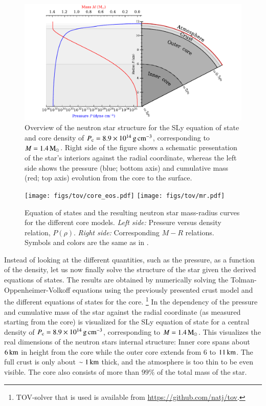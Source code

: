 \begin{figure}[t]
\centering
\includegraphics[width=16cm]{figs/slice/slice.pdf}
\caption{\label{fig:slice}
Overview of the neutron star structure for the SLy equation of state and core density of $P_{\mathrm{c}} = 8.9 \times 10^{14}\, \mathrm{g}\,\mathrm{cm}^{-3}$, corresponding to $M=1.4\, \mathrm{M}_{\odot}$.
Right side of the figure shows a schematic presentation of the star's interiors against the radial coordinate, whereas the left side shows the pressure (blue; bottom axis) and cumulative mass (red; top axis) evolution from the core to the surface.
}
\end{figure}

\begin{figure}[t]
\centering
\texttt{[image: figs/tov/core\_eos.pdf]}
\texttt{[image: figs/tov/mr.pdf]}
\caption{\label{fig:coreMR}
Equation of states and the resulting neutron star mass-radius curves for the different core models.
\emph{Left side:} Pressure versus density relation, $P(\rho)$.
\emph{Right side:} Corresponding $M-R$ relations.
Symbols and colors are the same as in .
}
\end{figure}

Instead of looking at the different quantities, such as the pressure, as a function of the density, let us now finally solve the structure of the star given the derived equations of states.
The results are obtained by numerically solving the Tolman-Oppenheimer-Volkoff equations using the previously presented crust model and the different equations of states for the core.%
\footnote{TOV-solver that is used is available from \url{https://github.com/natj/tov}.}
In  the dependency of the pressure and cumulative mass of the star against the radial coordinate (as measured starting from the core) is visualized for the SLy equation of state for a central density of $P_{\mathrm{c}} = 8.9 \times 10^{14}\, \mathrm{g}\,\mathrm{cm}^{-3}$, corresponding to $M=1.4\, \mathrm{M}_{\odot}$.
This visualizes the real dimensions of the neutron stars internal structure:
Inner core spans about $6\, \mathrm{km}$ in height from the core while the outer core extends from $6$ to $11\, \mathrm{km}$.
The full crust is only about $\sim 1\, \mathrm{km}$ thick, and the atmosphere is too thin to be even visible.
The core also consists of more than $99\%$ of the total mass of the star.




